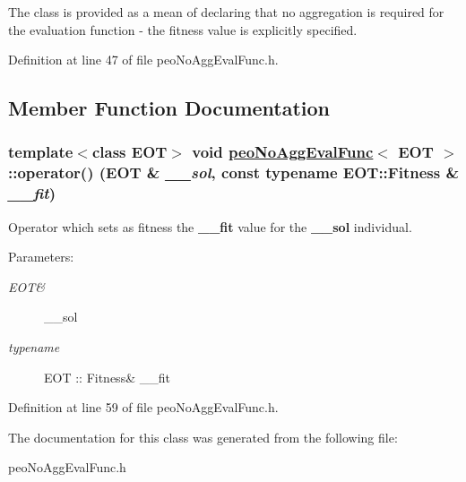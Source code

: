 The class is provided as a mean of declaring that no aggregation is required for the evaluation function - the fitness value is explicitly specified. 



Definition at line 47 of file peo\-No\-Agg\-Eval\-Func.h.

\subsection{Member Function Documentation}
\hypertarget{classpeoNoAggEvalFunc_1a69ee1af8745ac75c864bf884436de5}{
\subsubsection[operator()]{\setlength{\rightskip}{0pt plus 5cm}template$<$class EOT$>$ void \hyperlink{classpeoNoAggEvalFunc}{peo\-No\-Agg\-Eval\-Func}$<$ EOT $>$::operator() (EOT \& {\em \_\-\_\-sol}, const typename EOT::Fitness \& {\em \_\-\_\-fit})}}
\label{classpeoNoAggEvalFunc_1a69ee1af8745ac75c864bf884436de5}


Operator which sets as fitness the {\bf \_\-\_\-fit} value for the {\bf \_\-\_\-sol} individual. 

\begin{Desc}
\item[Parameters:]
\begin{description}
\item[{\em EOT\&}]\_\-\_\-sol \item[{\em typename}]EOT :: Fitness\& \_\-\_\-fit \end{description}
\end{Desc}


Definition at line 59 of file peo\-No\-Agg\-Eval\-Func.h.

The documentation for this class was generated from the following file:\begin{CompactItemize}
\item 
peo\-No\-Agg\-Eval\-Func.h\end{CompactItemize}
